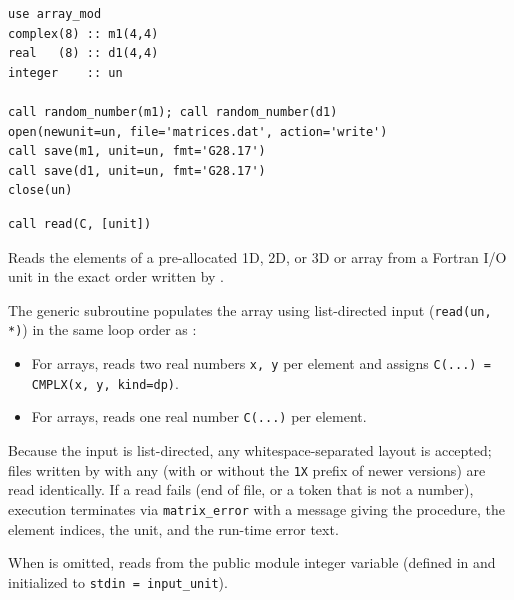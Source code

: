 \lstset{language=[95]Fortran}
\begin{lstlisting}
use array_mod
complex(8) :: m1(4,4)
real   (8) :: d1(4,4)
integer    :: un

call random_number(m1); call random_number(d1)
open(newunit=un, file='matrices.dat', action='write')
call save(m1, unit=un, fmt='G28.17')
call save(d1, unit=un, fmt='G28.17')
close(un)
\end{lstlisting}


\lstset{language=[95]Fortran}
\begin{lstlisting}
call read(C, [unit])
\end{lstlisting}

Reads the elements of a pre-allocated 1D, 2D, or 3D  or  array  from a Fortran I/O unit in the exact order written by .

The generic subroutine  populates the array  using list-directed input (\texttt{read(un, *)}) in the same loop order as :
\begin{itemize}
  \item For  arrays, reads two real numbers \texttt{x, y} per element and assigns \texttt{C(...) = CMPLX(x, y, kind=dp)}.
  \item For  arrays, reads one real number \texttt{C(...)} per element.
\end{itemize}
Because the input is list-directed, any whitespace-separated layout is accepted; files written by  with any  (with or without the \texttt{1X} prefix of newer versions) are read identically. If a read fails (end of file, or a token that is not a number), execution terminates via \texttt{matrix\_error} with a message giving the procedure, the element indices, the unit, and the run-time error text.

When  is omitted,  reads from the public module integer variable  (defined in  and initialized to \texttt{stdin = input\_unit}).


